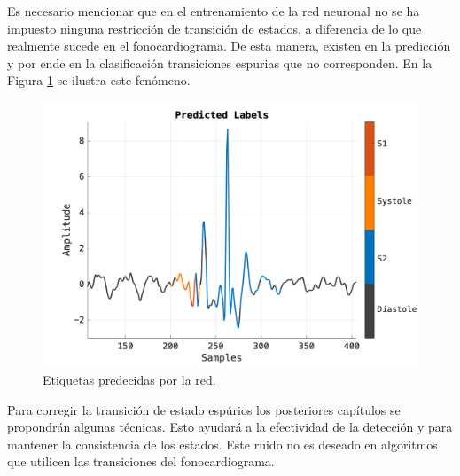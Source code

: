 \indent Es necesario mencionar que en el entrenamiento de la red neuronal no se ha impuesto ninguna restricción de transición de estados, a diferencia de lo que realmente sucede en el fonocardiograma. De esta manera, existen en la predicción y por ende en la clasificación transiciones espurias que no corresponden. En la Figura \ref{fig:spurious-transitions} se ilustra este fenómeno.

\begin{figure}[H]
    \centering
    \includegraphics[scale=0.3]{sections/chapter-07/images/predicted-labels.png}
    \caption[Etiquetas predecidas por la red]{Etiquetas predecidas por la red.}
    \label{fig:spurious-transitions}
\end{figure}

\indent Para corregir la transición de estado espúrios los posteriores capítulos se propondrán algunas técnicas. Esto ayudará a la efectividad de la detección y para mantener la consistencia de los estados. Este ruido no es deseado en algoritmos que utilicen las transiciones del fonocardiograma.

